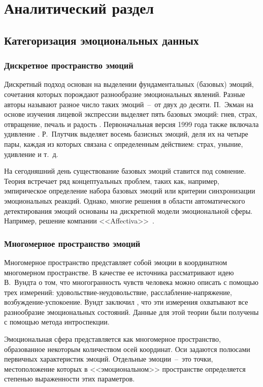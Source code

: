 \chapter{Аналитический раздел}
\section{Категоризация эмоциональных данных}
\subsection{Дискретное пространство эмоций}
Дискретный подход основан на выделении фундаментальных (базовых) эмоций, сочетания которых порождают разнообразие эмоциональных явлений. Разные авторы называют разное число таких эмоций~--~от двух до десяти. П.~Экман на основе изучения лицевой экспрессии выделяет пять базовых эмоций: гнев, страх, отвращение, печаль и радость \cite{Ekman1972}. Первоначальная версия 1999 года также включала удивление \cite{Ekman1992}. Р.~Плутчик \cite{Plutchik1980} выделяет восемь базисных эмоций, деля их на четыре пары, каждая из которых связана с определенным действием: страх, уныние, удивление и т.~д. 

На сегодняшний день существование базовых эмоций ставится под сомнение. Теория встречает ряд концептуальных проблем, таких как, например, эмпирическое определение набора базовых эмоций или критерии синхронизации эмоциональных реакций. Однако, многие решения в области автоматического детектирования эмоций основаны на дискретной модели эмоциональной сферы. Например, решение компании <<Affectiva>>~\cite{Affectica}.

\subsection{Многомерное пространство эмоций}
Многомерное пространство представляет собой эмоции в координатном многомерном пространстве. В качестве ее источника рассматривают идею В.~Вундта о том, что многогранность чувств
человека можно описать с помощью трех измерений: удовольствие-неудовольствие, расслабление-напряжение, возбуждение-успокоение. Вундт заключил \cite{Вундт1984}, что эти измерения охватывают все разнообразие эмоциональных состояний. Данные для этой теории были получены с помощью метода интроспекции.

Эмоциональная сфера представляется как многомерное пространство, образованное некоторым
количеством осей координат. Оси задаются полюсами первичных характеристик эмоций. Отдельные эмоции~--~это точки, местоположение которых в <<эмоциональном>> пространстве определяется степенью выраженности этих параметров.

